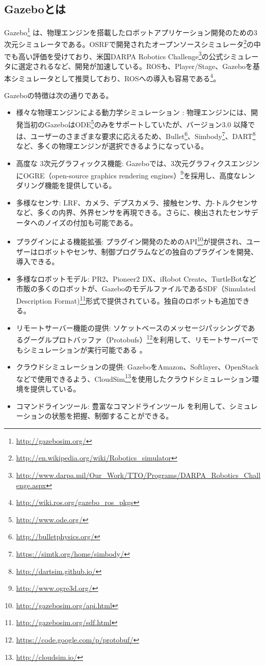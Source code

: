 \subsection{Gazeboとは}

Gazebo\footnote{\url{http://gazebosim.org/}} は、物理エンジンを搭載したロボットアプリケーション開発のための3次元シミュレータである。OSRFで開発されたオープンソースシミュレータ\footnote{\url{http://en.wikipedia.org/wiki/Robotics\_simulator}}の中でも高い評価を受けており、米国DARPA Robotics Challenge\footnote{\url{http://www.darpa.mil/Our\_Work/TTO/Programs/DARPA\_Robotics\_Challenge.aspx}}の公式シミュレータに選定されるなど、開発が加速している。ROSも、Player/Stage、Gazeboを基本シミュレータとして推奨しており、ROSへの導入も容易である\footnote{\url{http://wiki.ros.org/gazebo\_ros\_pkgs}}。

Gazeboの特徴は次の通りである。

\begin{itemize}
\item 様々な物理エンジンによる動力学シミュレーション  : 物理エンジンには、開発当初のGazeboはODE\footnote{\url{http://www.ode.org/}}のみをサポートしていたが、バージョン3.0  以降では、ユーザーのさまざまな要求に応えるため、Bullet\footnote{\url{http://bulletphysics.org/}}、Simbody\footnote{\url{https://simtk.org/home/simbody/}}、DART\footnote{\url{http://dartsim.github.io/}}など、多くの物理エンジンが選択できるようになっている。
\item 高度な 3次元グラフィックス機能: Gazeboでは、3次元グラフィクスエンジンにOGRE（open-source graphics rendering engines）\footnote{\url{http://www.ogre3d.org/}}を採用し、高度なレンダリング機能を提供している。
\item  多様なセンサ:  LRF、カメラ、デプスカメラ、接触センサ、力-トルクセンサなど、多くの内界、外界センサを再現できる。さらに、検出されたセンサデータへのノイズの付加も可能である。
\item  プラグインによる機能拡張: プラグイン開発のためのAPI\footnote{\url{http://gazebosim.org/api.html}}が提供され、ユーザーはロボットやセンサ、制御プログラムなどの独自のプラグインを開発、導入できる。
\item  多様なロボットモデル: PR2、Pioneer2 DX、iRobot Create、TurtleBotなど市販の多くのロボットが、GazeboのモデルファイルであるSDF（Simulated Description Format)\footnote{\url{http://gazebosim.org/sdf.html}}形式で提供されている。独自のロボットも追加できる。
\item  リモートサーバー機能の提供: ソケットベースのメッセージパッシングであるグーグルプロトバッファ（Protobufs）\footnote{\url{https://code.google.com/p/protobuf/}}を利用して、リモートサーバーでもシミュレーションが実行可能である  。
\item  クラウドシミュレーションの提供: GazeboをAmazon、Softlayer、OpenStackなどで使用できるよう、CloudSim\footnote{\url{http://cloudsim.io/}}を使用したクラウドシミュレーション環境を提供している。
\item コマンドラインツール: 豊富なコマンドラインツール  を利用して、シミュレーションの状態を把握、制御することができる。
\end{itemize}

